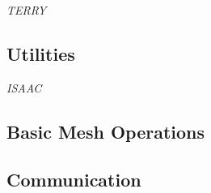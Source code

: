 
{\it TERRY}

\subsection{Utilities}
\label{sec:utilities}


{\it ISAAC}

\subsection{Basic Mesh Operations}
\label{sec:mesh}


\subsection{Communication}
\label{sec:comm}


